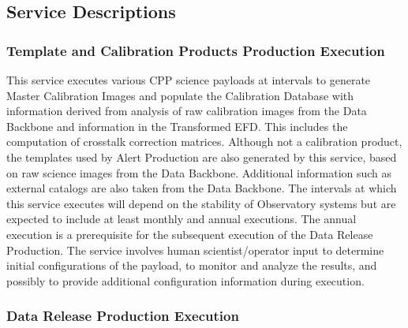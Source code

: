 \documentclass[DM,lsstdraft,toc]{lsstdoc}
\begin{document}
\subsection{Service Descriptions}\label{ncsa-l2-service-descriptions}

\subsubsection{Template and Calibration Products Production
Execution}\label{template-and-calibration-products-production-execution}

This service executes various CPP science payloads at intervals to
generate Master Calibration Images and populate the Calibration Database
with information derived from analysis of raw calibration images from
the Data Backbone and information in the Transformed EFD. This includes
the computation of crosstalk correction matrices. Although not a
calibration product, the templates used by Alert Production are also
generated by this service, based on raw science images from the Data
Backbone. Additional information such as external catalogs are also
taken from the Data Backbone. The intervals at which this service
executes will depend on the stability of Observatory systems but are
expected to include at least monthly and annual executions. The annual
execution is a prerequisite for the subsequent execution of the Data
Release Production. The service involves human scientist/operator input
to determine initial configurations of the payload, to monitor and
analyze the results, and possibly to provide additional configuration
information during execution.

\subsubsection{Data Release Production
Execution}\label{data-release-production-execution}
\end{document}

